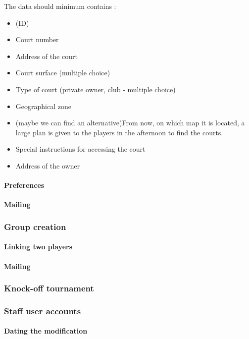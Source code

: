 The data should minimum contains :

\begin{itemize}
    \item (ID)
    \item Court number
    \item Address of the court
    \item Court surface (multiple choice)
    \item Type of court (private owner, club - multiple choice)
    \item Geographical zone
    \item (maybe we can find an alternative)From now, on which map it is
        located, a large plan is given to the players in the afternoon
        to find the courts.
    \item Special instructions for accessing the court
    \item Address of the owner
\end{itemize}

\paragraph{Preferences}
\paragraph{Mailing}

\subsubsection{Group creation}

\paragraph{Linking two players}
\paragraph{Mailing}

\subsubsection{Knock-off tournament}
\subsubsection{Staff user accounts}

\paragraph{Dating the modification}
